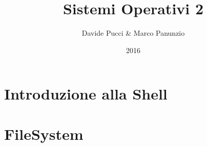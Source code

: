 

\title{Sistemi Operativi 2}
\author{Davide Pucci \& Marco Panunzio}
\date{2016}

\maketitle
\tableofcontents

\chapter{Introduzione alla Shell}


\chapter{FileSystem}




